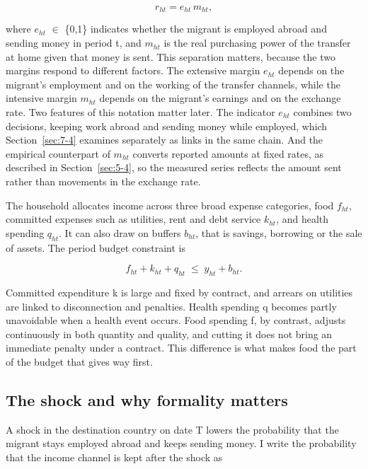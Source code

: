 \begin{equation}\label{eq:remit}
r_{ht} = e_{ht}\, m_{ht},
\end{equation}

where $e_{ht}$ $\in$ \{0,1\} indicates whether the migrant is employed abroad and sending money in period t, and $m_{ht}$ is the real purchasing power of the transfer at home given that money is sent. This separation matters, because the two margins respond to different factors. The extensive margin $e_{ht}$ depends on the migrant's employment and on the working of the transfer channels, while the intensive margin $m_{ht}$ depends on the migrant's earnings and on the exchange rate. Two features of this notation matter later. The indicator $e_{ht}$ combines two decisions, keeping work abroad and sending money while employed, which Section~\ref{sec:7-4} examines separately as links in the same chain. And the empirical counterpart of $m_{ht}$ converts reported amounts at fixed rates, as described in Section~\ref{sec:5-4}, so the measured series reflects the amount sent rather than movements in the exchange rate.

The household allocates income across three broad expense categories, food $f_{ht}$, committed expenses such as utilities, rent and debt service $k_{ht}$, and health spending $q_{ht}$. It can also draw on buffers $b_{ht}$, that is savings, borrowing or the sale of assets. The period budget constraint is

\begin{equation}\label{eq:budget}
f_{ht} + k_{ht} + q_{ht} \;\leq\; y_{ht} + b_{ht}.
\end{equation}

Committed expenditure k is large and fixed by contract, and arrears on utilities are linked to disconnection and penalties. Health spending q becomes partly unavoidable when a health event occurs. Food spending f, by contrast, adjusts continuously in both quantity and quality, and cutting it does not bring an immediate penalty under a contract. This difference is what makes food the part of the budget that gives way first.

\subsection{The shock and why formality matters}\label{sec:4-2}

A shock in the destination country on date T lowers the probability that the migrant stays employed abroad and keeps sending money. I write the probability that the income channel is kept after the shock as

